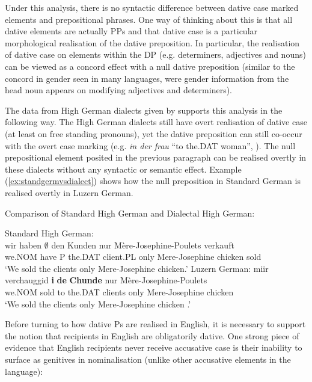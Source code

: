 	Under this analysis, there is no syntactic difference between dative case marked elements and prepositional phrases. One way of thinking about this is that all dative elements are actually PPs \citep{Bittner.1996,Caha.2009,Alexiadou.2014} and that dative case is a particular morphological realisation of the dative preposition. In particular, the realisation of dative case on elements within the DP (e.g. determiners, adjectives and nouns) can be viewed as a concord effect with a null dative preposition (similar to the concord in gender seen in many languages, were gender information from the head noun appears on modifying adjectives and determiners).

	The data from High German dialects given by \cite{Seiler.2001,Seiler.2003} supports this analysis in the following way. The High German dialects still have overt realisation of dative case (at least on free standing pronouns), yet the dative preposition can still co-occur with the overt case marking (e.g. \textit{in der frau} ``to the.DAT woman'', \citealt[ex 3]{Seiler.2001}). The null prepositional element posited in the previous paragraph can be realised overtly in these dialects without any syntactic or semantic effect. Example (\ref{ex:standgermvsdialect}) shows how the null preposition in Standard German is realised overtly in Luzern German.

	\begin{exe}
		\ex Comparison of Standard High German and Dialectal High German:\label{ex:standgermvsdialect}
		\begin{xlist}
			\ex Standard High German:\\
			\gll wir haben $\emptyset$ den Kunden nur Mère-Josephine-Poulets verkauft\\
			we.NOM have P the.DAT client.PL only {Mere-Josephine chicken} sold\\
			\trans `We sold the clients only Mere-Josephine chicken.'
			\ex Luzern German:
			\gll miir verchauggid \textbf{i} \textbf{de} \textbf{Chunde} nur Mère-Josephine-Poulets\\
			we.NOM sold to the.DAT clients only {Mere-Josephine chicken}\\
			`We sold the clients only Mere-Josephine chicken \citep[pg. 175]{Seiler.2003}.'
		\end{xlist}
	\end{exe}

	Before turning to how dative Ps are realised in English, it is necessary to support the notion that recipients in English are obligatorily dative. One strong piece of evidence that English recipients never receive accusative case is their inability to surface as genitives in nominalisation (unlike other accusative elements in the language):

